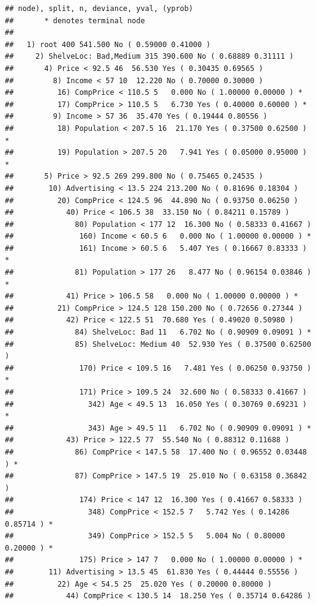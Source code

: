 \documentclass[]{book}
\begin{document}
\begin{verbatim}
## node), split, n, deviance, yval, (yprob)
##       * denotes terminal node
## 
##   1) root 400 541.500 No ( 0.59000 0.41000 )  
##     2) ShelveLoc: Bad,Medium 315 390.600 No ( 0.68889 0.31111 )  
##       4) Price < 92.5 46  56.530 Yes ( 0.30435 0.69565 )  
##         8) Income < 57 10  12.220 No ( 0.70000 0.30000 )  
##          16) CompPrice < 110.5 5   0.000 No ( 1.00000 0.00000 ) *
##          17) CompPrice > 110.5 5   6.730 Yes ( 0.40000 0.60000 ) *
##         9) Income > 57 36  35.470 Yes ( 0.19444 0.80556 )  
##          18) Population < 207.5 16  21.170 Yes ( 0.37500 0.62500 ) *
##          19) Population > 207.5 20   7.941 Yes ( 0.05000 0.95000 ) *
##       5) Price > 92.5 269 299.800 No ( 0.75465 0.24535 )  
##        10) Advertising < 13.5 224 213.200 No ( 0.81696 0.18304 )  
##          20) CompPrice < 124.5 96  44.890 No ( 0.93750 0.06250 )  
##            40) Price < 106.5 38  33.150 No ( 0.84211 0.15789 )  
##              80) Population < 177 12  16.300 No ( 0.58333 0.41667 )  
##               160) Income < 60.5 6   0.000 No ( 1.00000 0.00000 ) *
##               161) Income > 60.5 6   5.407 Yes ( 0.16667 0.83333 ) *
##              81) Population > 177 26   8.477 No ( 0.96154 0.03846 ) *
##            41) Price > 106.5 58   0.000 No ( 1.00000 0.00000 ) *
##          21) CompPrice > 124.5 128 150.200 No ( 0.72656 0.27344 )  
##            42) Price < 122.5 51  70.680 Yes ( 0.49020 0.50980 )  
##              84) ShelveLoc: Bad 11   6.702 No ( 0.90909 0.09091 ) *
##              85) ShelveLoc: Medium 40  52.930 Yes ( 0.37500 0.62500 )  
##               170) Price < 109.5 16   7.481 Yes ( 0.06250 0.93750 ) *
##               171) Price > 109.5 24  32.600 No ( 0.58333 0.41667 )  
##                 342) Age < 49.5 13  16.050 Yes ( 0.30769 0.69231 ) *
##                 343) Age > 49.5 11   6.702 No ( 0.90909 0.09091 ) *
##            43) Price > 122.5 77  55.540 No ( 0.88312 0.11688 )  
##              86) CompPrice < 147.5 58  17.400 No ( 0.96552 0.03448 ) *
##              87) CompPrice > 147.5 19  25.010 No ( 0.63158 0.36842 )  
##               174) Price < 147 12  16.300 Yes ( 0.41667 0.58333 )  
##                 348) CompPrice < 152.5 7   5.742 Yes ( 0.14286 0.85714 ) *
##                 349) CompPrice > 152.5 5   5.004 No ( 0.80000 0.20000 ) *
##               175) Price > 147 7   0.000 No ( 1.00000 0.00000 ) *
##        11) Advertising > 13.5 45  61.830 Yes ( 0.44444 0.55556 )  
##          22) Age < 54.5 25  25.020 Yes ( 0.20000 0.80000 )  
##            44) CompPrice < 130.5 14  18.250 Yes ( 0.35714 0.64286 )  

\end{verbatim}
\end{document}

